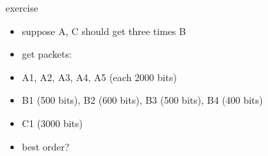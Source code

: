 \begin{frame}{exercise}
    \begin{itemize}
    \item suppose A, C should get three times B
    \item get packets:
    \vspace{.5cm}
    \item A1, A2, A3, A4, A5 (each 2000 bits)
    \item B1 (500 bits), B2 (600 bits), B3 (500 bits), B4 (400 bits)
    \item C1 (3000 bits)
    \vspace{.5cm}
    \item best order?
    \end{itemize}
\end{frame}
